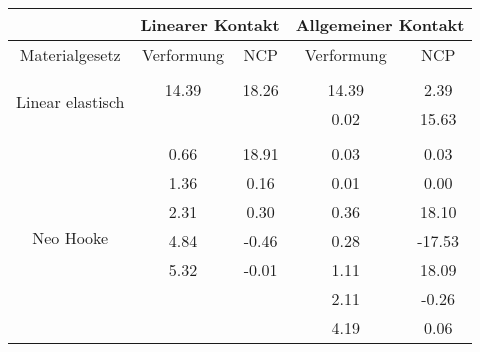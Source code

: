 \begin{table} 
\centering 
\begin{tabular}{c|cc|cc|} 
\cline{2-5} 
 & \multicolumn{2}{|c|}{Linearer Kontakt} & \multicolumn{2}{|c|}{Allgemeiner Kontakt} \\ 
\hline 
\multicolumn{1}{|c|}{Materialgesetz} & \multicolumn{1}{c|}{Verformung} & \multicolumn{1}{c|}{NCP} & \multicolumn{1}{c|}{Verformung} & \multicolumn{1}{c|}{NCP} \\ 
\hline 
\multicolumn{1}{|c|}{\multirow{3}{*}{Linear elastisch}} &\multicolumn{1}{|c|}{} & \multicolumn{1}{|c|}{} & \multicolumn{1}{|c|}{} & \multicolumn{1}{|c|}{} \\ 
\multicolumn{1}{|c|}{} & \multicolumn{1}{|c|}{     14.39} & \multicolumn{1}{|c|}{     18.26} & \multicolumn{1}{|c|}{     14.39} & \multicolumn{1}{|c|}{      2.39} \\ 
\multicolumn{1}{|c|}{} & \multicolumn{1}{|c|}{} & \multicolumn{1}{|c|}{} & \multicolumn{1}{|c|}{      0.02} & \multicolumn{1}{|c|}{     15.63} \\ 
\hline 
\multicolumn{1}{|c|}{\multirow{9}{*}{Neo Hooke}} &\multicolumn{1}{|c|}{} & \multicolumn{1}{|c|}{} & \multicolumn{1}{|c|}{} & \multicolumn{1}{|c|}{} \\ 
\multicolumn{1}{|c|}{} & \multicolumn{1}{|c|}{      0.66} & \multicolumn{1}{|c|}{     18.91} & \multicolumn{1}{|c|}{      0.03} & \multicolumn{1}{|c|}{      0.03} \\ 
\multicolumn{1}{|c|}{} & \multicolumn{1}{|c|}{      1.36} & \multicolumn{1}{|c|}{      0.16} & \multicolumn{1}{|c|}{      0.01} & \multicolumn{1}{|c|}{      0.00} \\ 
\multicolumn{1}{|c|}{} & \multicolumn{1}{|c|}{      2.31} & \multicolumn{1}{|c|}{      0.30} & \multicolumn{1}{|c|}{      0.36} & \multicolumn{1}{|c|}{     18.10} \\ 
\multicolumn{1}{|c|}{} & \multicolumn{1}{|c|}{      4.84} & \multicolumn{1}{|c|}{     -0.46} & \multicolumn{1}{|c|}{      0.28} & \multicolumn{1}{|c|}{    -17.53} \\ 
\multicolumn{1}{|c|}{} & \multicolumn{1}{|c|}{      5.32} & \multicolumn{1}{|c|}{     -0.01} & \multicolumn{1}{|c|}{      1.11} & \multicolumn{1}{|c|}{     18.09} \\ 
\multicolumn{1}{|c|}{} & \multicolumn{1}{|c|}{} & \multicolumn{1}{|c|}{} & \multicolumn{1}{|c|}{      2.11} & \multicolumn{1}{|c|}{     -0.26} \\ 
\multicolumn{1}{|c|}{} & \multicolumn{1}{|c|}{} & \multicolumn{1}{|c|}{} & \multicolumn{1}{|c|}{      4.19} & \multicolumn{1}{|c|}{      0.06} \\ 

\end{tabular}
\end{table}
